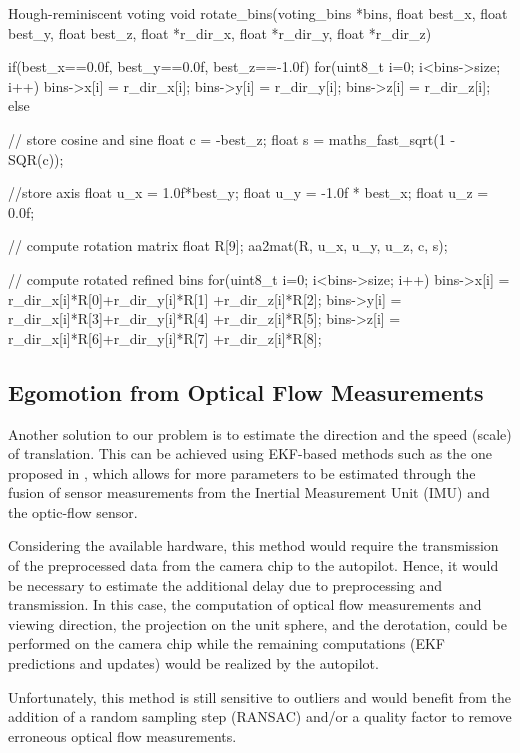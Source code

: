 \begin{code}[colback=white, label=algo:rotation]{Hough-reminiscent voting}
void rotate_bins(voting_bins *bins, float best_x, 
						float best_y, float best_z, 
						float *r_dir_x, float *r_dir_y, 
						float *r_dir_z)
{
	if(best_x==0.0f, best_y==0.0f, best_z==-1.0f){
		for(uint8_t i=0; i<bins->size; i++){
			bins->x[i] = r_dir_x[i];
			bins->y[i] = r_dir_y[i];
			bins->z[i] = r_dir_z[i];
		} 
	}
	else{
		// store cosine and sine
		float c = -best_z;
		float s = maths_fast_sqrt(1 - SQR(c)); 

		//store axis
		float u_x = 1.0f*best_y;					
		float u_y = -1.0f * best_x;					
		float u_z = 0.0f;

		// compute rotation matrix
		float R[9];
		aa2mat(R, u_x, u_y, u_z, c, s);

		// compute rotated refined bins
		for(uint8_t i=0; i<bins->size; i++){
			bins->x[i] = r_dir_x[i]*R[0]+r_dir_y[i]*R[1]
							+r_dir_z[i]*R[2];
			bins->y[i] = r_dir_x[i]*R[3]+r_dir_y[i]*R[4]
							+r_dir_z[i]*R[5];
			bins->z[i] = r_dir_x[i]*R[6]+r_dir_y[i]*R[7]
							+r_dir_z[i]*R[8];
		} 
	}
}
\end{code}

\subsection{Egomotion from Optical Flow Measurements}
Another solution to our problem is to estimate the direction and the speed (scale) of translation. This can be achieved using EKF-based methods such as the one proposed in \cite{ekf}, which allows for more parameters to be estimated through the fusion of sensor measurements from the Inertial Measurement Unit (IMU) and the optic-flow sensor. 

Considering the available hardware, this method would require the transmission of the preprocessed data from the camera chip to the autopilot. Hence, it would be necessary to estimate the additional delay due to preprocessing and transmission. In this case, the computation of optical flow measurements and viewing direction, the projection on the unit sphere, and the derotation, could be performed on the camera chip while the remaining computations (EKF predictions and updates) would be realized by the autopilot.

Unfortunately, this method is still sensitive to outliers and would benefit from the addition of a random sampling step (RANSAC) and/or a quality factor to remove erroneous optical flow measurements. 

\newpage